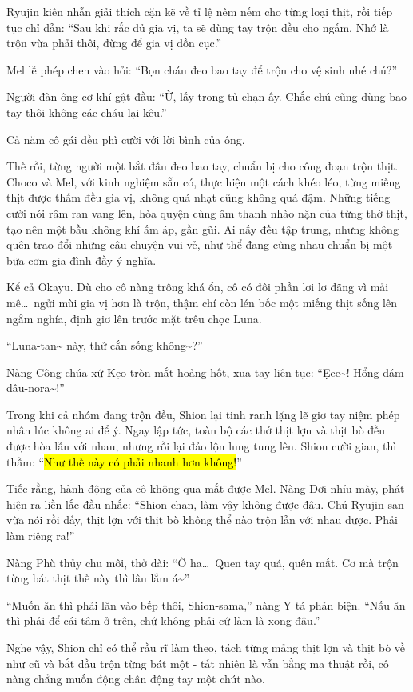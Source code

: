 \documentclass[../main.tex]{subfiles}
\begin{document}
Ryujin kiên nhẫn giải thích cặn kẽ về tỉ lệ nêm nếm cho từng loại thịt, rồi tiếp tục chỉ dẫn: ``Sau khi rắc đủ gia vị, ta sẽ dùng tay trộn đều cho ngấm. Nhớ là trộn vừa phải thôi, đừng để gia vị dồn cục.''

Mel lễ phép chen vào hỏi: ``Bọn cháu đeo bao tay để trộn cho vệ sinh nhé chú?''

Người đàn ông cơ khí gật đầu: ``Ừ, lấy trong tủ chạn ấy. Chắc chú cũng dùng bao tay thôi không các cháu lại kêu.''

Cả năm cô gái đều phì cười với lời bình của ông.

Thế rồi, từng người một bắt đầu đeo bao tay, chuẩn bị cho công đoạn trộn thịt. Choco và Mel, với kinh nghiệm sẵn có, thực hiện một cách khéo léo, từng miếng thịt được thấm đều gia vị, không quá nhạt cũng không quá đậm. Những tiếng cười nói râm ran vang lên, hòa quyện cùng âm thanh nhào nặn của từng thớ thịt, tạo nên một bầu không khí ấm áp, gần gũi. Ai nấy đều tập trung, nhưng không quên trao đổi những câu chuyện vui vẻ, như thể đang cùng nhau chuẩn bị một bữa cơm gia đình đầy ý nghĩa.

Kể cả Okayu. Dù cho cô nàng trông khá ổn, cô có đôi phần lơi lơ đãng vì mải mê\dots\ ngửi mùi gia vị hơn là trộn, thậm chí còn lén bốc một miếng thịt sống lên ngắm nghía, định giơ lên trước mặt trêu chọc Luna.

``Luna-tan\~{} này, thử cắn sống không\~{}?''

Nàng Công chúa xứ Kẹo tròn mắt hoảng hốt, xua tay liên tục: ``Ẹee\~{}! Hổng dám đâu-nora\~{}!''

Trong khi cả nhóm đang trộn đều, Shion lại tinh ranh lặng lẽ giơ tay niệm phép nhân lúc không ai để ý. Ngay lập tức, toàn bộ các thớ thịt lợn và thịt bò đều được hòa lẫn với nhau, nhưng rồi lại đảo lộn lung tung lên. Shion cười gian, thì thầm: ``\hl{Như thế này có phải nhanh hơn không!}''

Tiếc rằng, hành động của cô không qua mắt được Mel. Nàng Dơi nhíu mày, phát hiện ra liền lắc đầu nhắc: ``Shion-chan, làm vậy không được đâu. Chú Ryujin-san vừa nói rồi đấy, thịt lợn với thịt bò không thể nào trộn lẫn với nhau được. Phải làm riêng ra!''

Nàng Phù thủy chu môi, thở dài: ``Ờ ha\dots\ Quen tay quá, quên mất. Cơ mà trộn từng bát thịt thế này thì lâu lắm á\~{}''

``Muốn ăn thì phải lăn vào bếp thôi, Shion-sama,'' nàng Y tá phản biện. ``Nấu ăn thì phải để cái tâm ở trên, chứ không phải cứ làm là xong đâu.''

Nghe vậy, Shion chỉ có thể rầu rĩ làm theo, tách từng mảng thịt lợn và thịt bò về như cũ và bắt đầu trộn từng bát một - tất nhiên là vẫn bằng ma thuật rồi, cô nàng chẳng muốn động chân động tay một chút nào.
\end{document}
